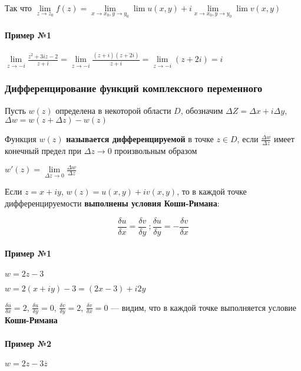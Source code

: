 \documentclass{article}
\begin{document}
Так что $\lim\limits_{z \to z_0} f(z) = \lim\limits_{x \to x_0, y \to y_0} \lim u(x, y) + i \lim\limits_{x \to x_0, y \to y_0} \lim v(x, y)$

\paragraph{Пример №1}

$\lim\limits_{z \to -i} \frac{z^2 + 3 i z - 2}{z + i} = \lim\limits_{z \to -i} \frac{(z + i)(z + 2 i)}{z + i} = \lim\limits_{z \to -i} (z + 2 i) = i$

\subsubsection{Дифференцирование функций комплексного переменного}

Пусть $w (z)$ определена в некоторой области $D$, обозначим $\Delta Z = \Delta x + i \Delta y$, $\Delta w = w (z + \Delta z) - w (z)$

Функция $w(z)$ \textbf{называется дифференцируемой} в точке $z \in D$, если $\frac{\Delta w}{\Delta z}$ имеет конечный предел при $\Delta z \to 0$ произвольным образом

$w' (z) = \lim\limits_{\Delta z \to 0} \frac{\Delta w}{\Delta z}$

\hfill

Если $z = x + i y$, $w(z) = u(x, y) + i v (x, y)$, то в каждой точке дифференцируемости \textbf{выполнены условия Коши-Римана}:

$$
\frac{\delta u}{\delta x} = \frac{\delta v}{\delta y} \ ; \frac{\delta u}{\delta y} = - \frac{\delta v}{\delta x}
$$

\paragraph{Пример №1}

$w = 2 z - 3$

$w = 2 (x + i y) - 3 = (2 x - 3) + i 2 y$

$\frac{\delta u}{\delta x} = 2$, $\frac{\delta u}{\delta y} = 0$, $\frac{\delta v}{\delta y} = 2$, $\frac{\delta v}{\delta x} = 0$ — видим, что в каждой точке выполняется условие \textbf{Коши-Римана}

\paragraph{Пример №2}

$w = 2 z - 3 \overline{z}$
\end{document}
